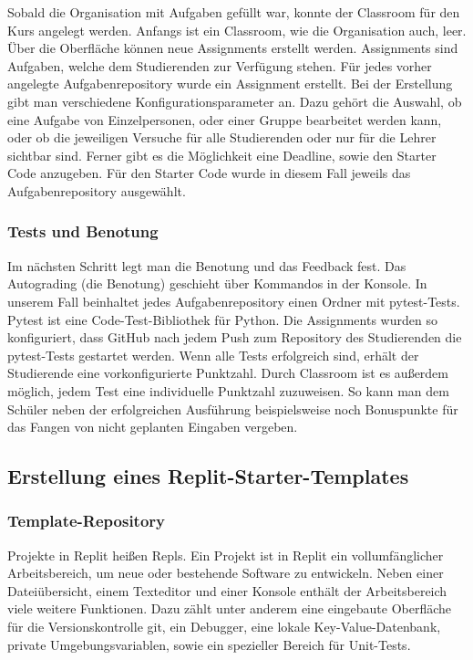 Sobald die Organisation mit Aufgaben gefüllt war, konnte der
\glqq Classroom\grqq{} für den Kurs angelegt werden. Anfangs ist ein Classroom,
wie die Organisation auch, leer. Über die Oberfläche können neue Assignments
erstellt werden. Assignments sind Aufgaben, welche dem Studierenden zur
Verfügung stehen. Für jedes vorher angelegte Aufgabenrepository wurde ein
Assignment erstellt. Bei der Erstellung gibt man verschiedene
Konfigurationsparameter an. Dazu gehört die Auswahl, ob eine Aufgabe von
Einzelpersonen, oder einer Gruppe bearbeitet werden kann, oder ob die jeweiligen
Versuche für alle Studierenden oder nur für die Lehrer sichtbar sind. Ferner
gibt es die Möglichkeit eine Deadline, sowie den Starter Code anzugeben. Für den
Starter Code wurde in diesem Fall jeweils das Aufgabenrepository ausgewählt.
\parencite{github-assignment-erstellen}
\subsubsection{Tests und Benotung}\label{classroom-tests}
Im nächsten Schritt legt man die Benotung und das Feedback fest. Das Autograding
(die Benotung) geschieht über Kommandos in der Konsole. In unserem Fall
beinhaltet jedes Aufgabenrepository einen Ordner mit pytest-Tests. Pytest ist
eine Code-Test-Bibliothek für Python. Die Assignments wurden so konfiguriert,
dass GitHub nach jedem Push zum Repository des Studierenden die pytest-Tests
gestartet werden. Wenn alle Tests erfolgreich sind, erhält der Studierende eine
vorkonfigurierte Punktzahl. Durch Classroom ist es außerdem möglich, jedem
Test eine individuelle Punktzahl zuzuweisen. So kann man dem Schüler neben der erfolgreichen Ausführung beispielsweise noch Bonuspunkte für das Fangen von
nicht geplanten Eingaben vergeben. \parencite{github-assignment-erstellen}

\subsection{Erstellung eines Replit-Starter-Templates}\label{replit-template}
\subsubsection{Template-Repository}\label{replit-template-repository}
Projekte in Replit heißen Repls. Ein Projekt ist in Replit ein vollumfänglicher
Arbeitsbereich, um neue oder bestehende Software zu entwickeln. Neben einer
Dateiübersicht, einem Texteditor und einer Konsole enthält der Arbeitsbereich
viele weitere Funktionen. Dazu zählt unter anderem eine eingebaute Oberfläche
für die Versionskontrolle git, ein Debugger, eine lokale Key-Value-Datenbank,
private Umgebungsvariablen, sowie ein spezieller Bereich für Unit-Tests.

